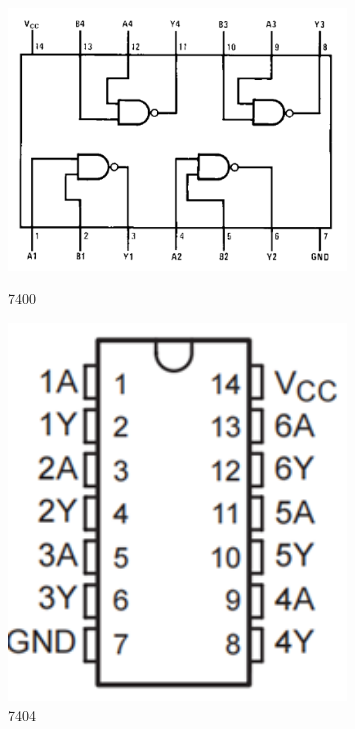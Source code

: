 \documentclass{ctexart}
\begin{document}
\begin{figure}[H]
    \centering
    \begin{minipage}{0.25\textwidth}
    \centering
           \includegraphics[width=0.8\textwidth]{fig/7400.png}
           \caption{7400}
    \label{}
    \end{minipage}
    \hspace{0.05\textwidth}
    \begin{minipage}{0.25\textwidth}
    \centering
           \includegraphics[width=0.8\textwidth]{fig/7404.png}
           \caption{7404}
    \label{}
    \end{minipage}
     \hspace{0.05\textwidth}
    \begin{minipage}{0.28\textwidth}

\end{minipage}
\end{figure}
\end{document}
